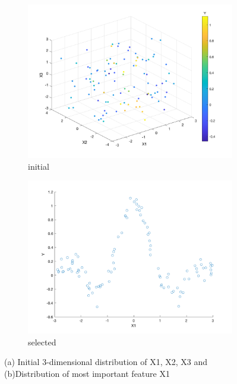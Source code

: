 \documentclass[a4paper, 11pt, one column]{article}
\begin{document}
\begin{figure}[H]
    \centering
    \begin{subfigure}{0.33\linewidth}
            \includegraphics[width=\linewidth]{images/ARD_all.png}
            \caption{initial}
        \end{subfigure}\hfil
        \begin{subfigure}{0.33\linewidth}
            \includegraphics[width=\linewidth]{images/ARD_selected.png}
            \caption{selected}
        \end{subfigure}\hfil
    \caption{(a) Initial 3-dimensional distribution of X1, X2, X3 and (b)Distribution of most important feature X1}
    \label{fig:ARD}
\end{figure}
\end{document}
